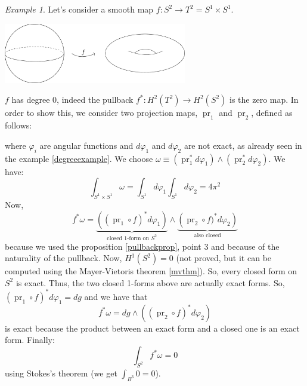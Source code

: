 \documentclass[a4paper,11pt,titlepage, article, oneside]{memoir}
\numberwithin{equation}{section}
\theoremstyle{definition}
\theoremstyle{remark}
\newtheorem{example}[theorem]{Example}
\DeclareMathOperator{\pr}{pr}
\begin{document}
\begin{tcolorbox}
\begin{example}
Let's consider a smooth map $f \colon S^2 \rightarrow T^2=S^1 \times S^1$.
\begin{minipage}{\textwidth} \label{Fig:torus}
\vspace{1em}
     \centering
     \includegraphics[width=0.6\textwidth]{Images/torus.pdf} 
\end{minipage}
$f$ has degree 0, indeed the pullback $f^*\colon H^2(T^2) \rightarrow H^2(S^2)$ is the zero map. In order to show this, we consider two projection maps, $\pr_1$ and $\pr_2$, defined as follows:
\begin{center}
\end{center}
where  $\varphi_i$ are angular functions and $d\varphi_1$ and $d\varphi_2$ are not exact, as already seen in the example \ref{degreeexample}.
We choose $\omega \equiv (\pr_1^* d \varphi_1) \wedge (\pr_2^* d\varphi_2)$. We have:
$$\int_{S^1 \times S^1} \omega = \int_{S^1} d\varphi_1 \int_{S^1} d\varphi_2 = 4 \pi^2$$
Now, 
$$f^* \omega = \underbrace{\left ( (\pr_1 \circ f)^* d \varphi_1 \right )}_{\text{closed 1-form on }S^2} \wedge \underbrace{\left( \pr_2 \circ f)^* d \varphi_2 \right)}_{\text{also closed}}$$
 because we used the proposition \ref{pullbackprop}, point 3 and because of the naturality of the pullback. Now, $H^1(S^2)=0$ (not proved, but it can be computed using the Mayer-Vietoris theorem \ref{mvthm}). So, every closed form on $S^2$ is exact. Thus, the two closed 1-forms above are actually exact forms.
So, $(\pr_1\circ f)^*d\varphi_1 = d g$ and we have that
$$f^*\omega = dg \wedge \left( (\pr_2 \circ f)^* d \varphi_2 \right)$$ is exact because the product between an exact form  and a closed one is an exact form. Finally:
$$\int_{S^2} f^* \omega = 0$$
using Stokes's theorem (we get $\int_{B^3} 0=0$).
\end{example}
\end{tcolorbox}
\end{document}
